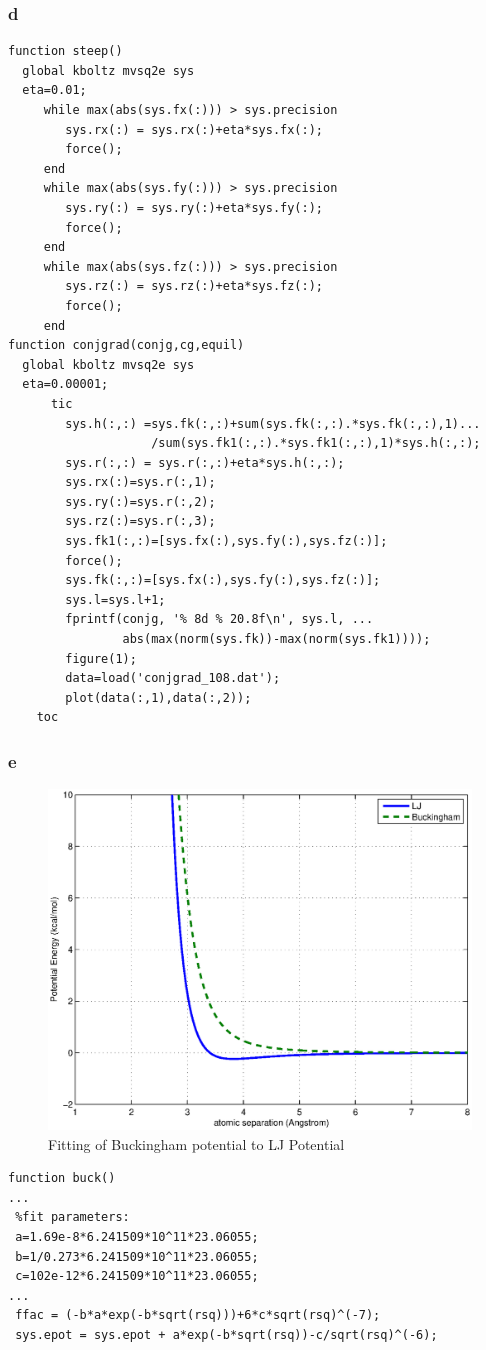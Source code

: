 \documentclass{article}
\begin{document}
\subsubsection*{d}
\begin{verbatim}
function steep()
  global kboltz mvsq2e sys
  eta=0.01;
     while max(abs(sys.fx(:))) > sys.precision
     	sys.rx(:) = sys.rx(:)+eta*sys.fx(:);
        force();
     end
     while max(abs(sys.fy(:))) > sys.precision
     	sys.ry(:) = sys.ry(:)+eta*sys.fy(:);
        force();
     end
     while max(abs(sys.fz(:))) > sys.precision
     	sys.rz(:) = sys.rz(:)+eta*sys.fz(:);
        force();
     end
function conjgrad(conjg,cg,equil)
  global kboltz mvsq2e sys
  eta=0.00001;
      tic        
        sys.h(:,:) =sys.fk(:,:)+sum(sys.fk(:,:).*sys.fk(:,:),1)...
                    /sum(sys.fk1(:,:).*sys.fk1(:,:),1)*sys.h(:,:);
        sys.r(:,:) = sys.r(:,:)+eta*sys.h(:,:);
        sys.rx(:)=sys.r(:,1);
        sys.ry(:)=sys.r(:,2);
        sys.rz(:)=sys.r(:,3);
        sys.fk1(:,:)=[sys.fx(:),sys.fy(:),sys.fz(:)];
        force();
        sys.fk(:,:)=[sys.fx(:),sys.fy(:),sys.fz(:)];
        sys.l=sys.l+1;
        fprintf(conjg, '% 8d % 20.8f\n', sys.l, ...
                abs(max(norm(sys.fk))-max(norm(sys.fk1))));	
        figure(1);
        data=load('conjgrad_108.dat');
        plot(data(:,1),data(:,2));
    toc
\end{verbatim}
\subsubsection*{e}
\begin{figure}[h!]
\centering
\includegraphics[totalheight=0.4\textheight]{fit}
\caption{Fitting of Buckingham potential to LJ Potential}
\label{fig:aNicePicture}
\end{figure}
\begin{verbatim}
function buck()
...
 %fit parameters:
 a=1.69e-8*6.241509*10^11*23.06055;
 b=1/0.273*6.241509*10^11*23.06055;
 c=102e-12*6.241509*10^11*23.06055;
...
 ffac = (-b*a*exp(-b*sqrt(rsq)))+6*c*sqrt(rsq)^(-7);
 sys.epot = sys.epot + a*exp(-b*sqrt(rsq))-c/sqrt(rsq)^(-6);
\end{verbatim}
\end{document}
